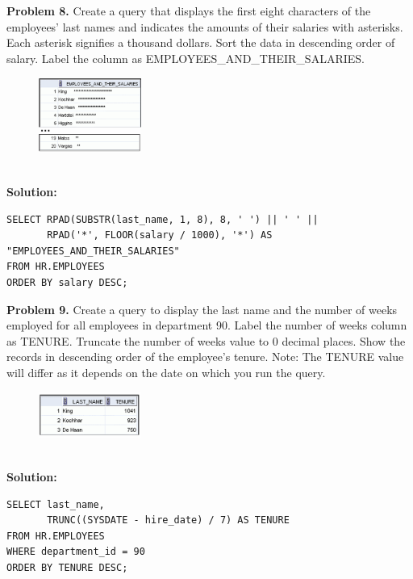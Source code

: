 \documentclass[12pt,a4paper]{article}
\begin{document}
\vspace{0.5cm}

\textbf{Problem 8.} Create a query that displays the first eight characters of the employees' last names and indicates the amounts of their salaries with asterisks. Each asterisk signifies a thousand dollars. Sort the data in descending order of salary. Label the column as EMPLOYEES\_AND\_THEIR\_SALARIES.
\begin{figure}[htbp]
  \centering
  \includegraphics[width=0.3\textwidth]{Screenshots/38.png}
\end{figure}\\
\textbf{Solution:}
\begin{lstlisting}[style=sqlstyle]
SELECT RPAD(SUBSTR(last_name, 1, 8), 8, ' ') || ' ' ||
       RPAD('*', FLOOR(salary / 1000), '*') AS "EMPLOYEES_AND_THEIR_SALARIES"
FROM HR.EMPLOYEES
ORDER BY salary DESC;
\end{lstlisting}

\vspace{0.5cm}

\textbf{Problem 9.} Create a query to display the last name and the number of weeks employed for all employees in department 90. Label the number of weeks column as TENURE. Truncate the number of weeks value to 0 decimal places. Show the records in descending order of the employee's tenure. Note: The TENURE value will differ as it depends on the date on which you run the query.
\begin{figure}[htbp]
  \centering
  \includegraphics[width=0.3\textwidth]{Screenshots/39.png}
\end{figure}\\
\textbf{Solution:}
\begin{lstlisting}[style=sqlstyle]
SELECT last_name,
       TRUNC((SYSDATE - hire_date) / 7) AS TENURE
FROM HR.EMPLOYEES
WHERE department_id = 90
ORDER BY TENURE DESC;
\end{lstlisting}

\vspace{0.5cm}
\end{document}
